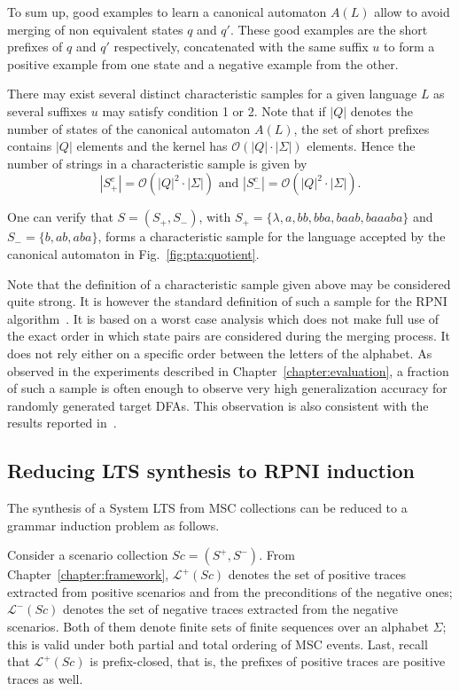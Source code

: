 To sum up, good examples to learn a canonical automaton $A(L)$ allow to avoid merging of non equivalent states $q$ and $q'$. These good examples are the short prefixes of $q$ and $q'$ respectively, concatenated with the same suffix $u$ to form a positive example from one state and a negative example from the other. 

There may exist several distinct characteristic samples for a given language $L$ as several suffixes $u$ may satisfy condition 1 or 2. Note that if $|Q|$ denotes the number of states of the canonical automaton $A(L)$, the set of short prefixes contains $|Q|$ elements and the kernel has $\mathcal{O}(|Q|\cdot |\Sigma |)$ elements. Hence the number of strings in a characteristic sample is given by 
\[
|S_{+}^c|=\mathcal{O}(|Q|^2\cdot |\Sigma |)\mbox{ and }|S_{-}^c|=\mathcal{O}(|Q|^2\cdot |\Sigma |). 
\]

One can verify that $S = (S_+, S_-)$, with $S_+ = \{\lambda, a, bb, bba, baab, baaaba\}$ and $S_- = \{b, ab, aba\}$, forms a characteristic sample for the language accepted by the canonical automaton in Fig.~\ref{fig:pta:quotient}.

Note that the definition of a characteristic sample given above may be considered quite strong. It is however the standard definition of such a sample for the RPNI algorithm~\cite{Oncina:1992,Dupont:1996b}. It is based on a worst case analysis which does not make full use of the exact order in which state pairs are considered during the merging process. It does not rely either on a specific order between the letters of the alphabet. As observed in the experiments described in Chapter~\ref{chapter:evaluation}, a fraction of such a sample is often enough to observe very high generalization accuracy for randomly generated target DFAs. This observation is also consistent with the results reported in~\cite{Lang:1998}.

\subsection{Reducing LTS synthesis to RPNI induction}

The synthesis of a System LTS from MSC collections can be reduced to a grammar induction problem as follows. 

Consider a scenario collection $Sc = (S^+, S^-)$. From Chapter~\ref{chapter:framework}, $\mathcal{L}^+(Sc)$ denotes the set of positive traces extracted from positive scenarios and from the preconditions of the negative ones; $\mathcal{L}^-(Sc)$ denotes the set of negative traces extracted from the negative scenarios. Both of them denote finite sets of finite sequences over an alphabet $\Sigma$; this is valid under both partial and total ordering of MSC events. Last, recall that $\mathcal{L}^+(Sc)$ is prefix-closed, that is, the prefixes of positive traces are positive traces as well.

